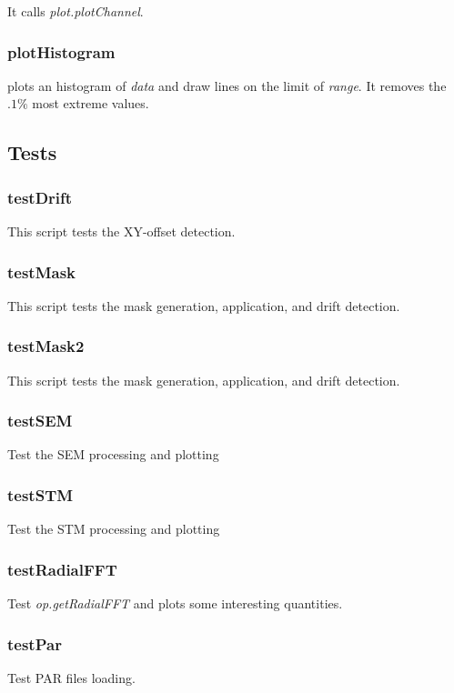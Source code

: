 It calls \emph{plot.plotChannel}. 

\subsubsection{plotHistogram}
\bdf
{} plots an histogram of \emph{data} and draw lines on the limit of \emph{range}. It removes the $.1\%$ most extreme values. 
\edf

\subsection{Tests}

\subsubsection{testDrift}
This script tests the XY-offset detection.

\subsubsection{testMask}
This script tests the mask generation, application, and drift detection.

\subsubsection{testMask2}
This script tests the mask generation, application, and drift detection.

\subsubsection{testSEM}
Test the SEM processing and plotting

\subsubsection{testSTM}
Test the STM processing and plotting

\subsubsection{testRadialFFT}
Test \emph{op.getRadialFFT} and plots some interesting quantities.

\subsubsection{testPar}
Test PAR files loading.


